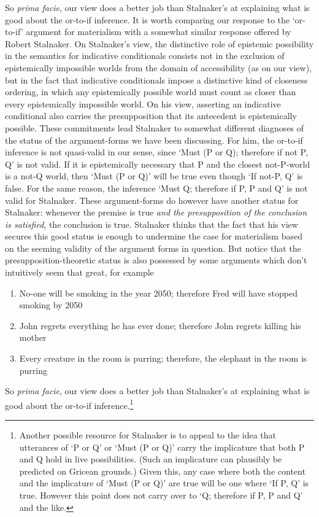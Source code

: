 So \emph{prima facie}, our view does a better job than Stalnaker's at
explaining what is good about the or-to-if inference. It is worth
comparing our response to the `or-to-if' argument for materialism with a
somewhat similar response offered by Robert Stalnaker. On Stalnaker's
view, the distinctive role of epistemic possibility in the semantics for
indicative conditionals consists not in the exclusion of epistemically
impossible worlds from the domain of accessibility (as on our view), but
in the fact that indicative conditionals impose a distinctive kind of
closeness ordering, in which any epistemically possible world must count
as closer than every epistemically impossible world. On his view,
asserting an indicative conditional also carries the presupposition that
its antecedent is epistemically possible. These commitments lead
Stalnaker to somewhat different diagnoses of the status of the
argument-forms we have been discussing. For him, the or-to-if inference
is not quasi-valid in our sense, since `Must (P or Q); therefore if not
P, Q' is not valid. If it is epistemically necessary that P and the
closest not-P-world is a not-Q world, then `Must (P or Q)' will be true
even though `If not-P, Q' is false. For the same reason, the inference
`Must Q; therefore if P, P and Q' is not valid for Stalnaker. These
argument-forms do however have another status for Stalnaker: whenever
the premise is true \emph{and the presupposition of the conclusion is
satisfied}, the conclusion is true. Stalnaker thinks that the fact that
his view secures this good status is enough to undermine the case for
materialism based on the seeming validity of the argument forms in
question. But notice that the presupposition-theoretic status is also
possessed by some arguments which don't intuitively seem that great, for
example

\begin{enumerate}
\def\labelenumi{(\arabic{enumi})}
\setcounter{enumi}{29}
\item
  No-one will be smoking in the year 2050; therefore Fred will have
  stopped smoking by 2050
\item
  John regrets everything he has ever done; therefore John regrets
  killing his mother
\item
  Every creature in the room is purring; therefore, the elephant in the
  room is purring
\end{enumerate}

So \emph{prima facie}, our view does a better job than Stalnaker's at
explaining what is good about the or-to-if inference.\footnote{Another
  possible resource for Stalnaker is to appeal to the idea that
  utterances of `P or Q' or `Must (P or Q)' carry the implicature that
  both P and Q hold in live possibilities. (Such an implicature can
  plausibly be predicted on Gricean grounds.) Given this, any case where
  both the content and the implicature of `Must (P or Q)' are true will
  be one where `If P, Q' is true. However this point does not carry over
  to `Q; therefore if P, P and Q' and the like.}


